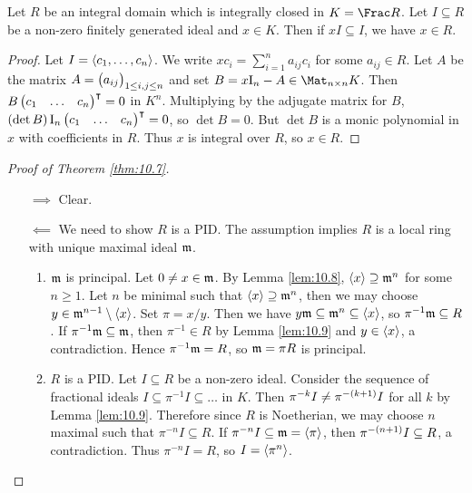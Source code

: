 \begin{lemma}
\label{lem:10.9}
Let $ R $ be an integral domain which is integrally closed in $ K = \Frac R $. Let $ I \subseteq R $ be a non-zero finitely generated ideal and $ x \in K $. Then if $ xI \subseteq I $, we have $ x \in R $.
\end{lemma}

\begin{proof}
Let $ I = \left\langle c_1, \dots, c_n \right\rangle $. We write $ xc_i = \sum_{i = 1}^n a_{ij}c_i $ for some $ a_{ij} \in R $. Let $ A $ be the matrix $ A = \br{a_{ij}}_{1 \le i, j \le n} $ and set $ B = x\I_n - A \in \Mat_{n \times n} K $. Then $ B\onebythree{c_1}{\dots}{c_n}^\intercal = 0 $ in $ K^n $. Multiplying by the adjugate matrix for $ B $, $ \br{\det B}\I_n\onebythree{c_1}{\dots}{c_n}^\intercal = 0 $, so $ \det B = 0 $. But $ \det B $ is a monic polynomial in $ x $ with coefficients in $ R $. Thus $ x $ is integral over $ R $, so $ x \in R $.
\end{proof}

\begin{proof}[Proof of Theorem \ref{thm:10.7}]
\hfill
\begin{itemize}
\item[$ \implies $] Clear.
\item[$ \impliedby $] We need to show $ R $ is a PID. The assumption implies $ R $ is a local ring with unique maximal ideal $ \mathfrak{m} $.
\begin{enumerate}[leftmargin=0.5in, label=Step \arabic*.]
\item $ \mathfrak{m} $ is principal. Let $ 0 \ne x \in \mathfrak{m} $. By Lemma \ref{lem:10.8}, $ \left\langle x \right\rangle \supseteq \mathfrak{m}^n $ for some $ n \ge 1 $. Let $ n $ be minimal such that $ \left\langle x \right\rangle \supseteq \mathfrak{m}^n $, then we may choose $ y \in \mathfrak{m}^{n - 1} \setminus \left\langle x \right\rangle $. Set $ \pi = x / y $. Then we have $ y\mathfrak{m} \subseteq \mathfrak{m}^n \subseteq \left\langle x \right\rangle $, so $ \pi^{-1}\mathfrak{m} \subseteq R $. If $ \pi^{-1}\mathfrak{m} \subseteq \mathfrak{m} $, then $ \pi^{-1} \in R $ by Lemma \ref{lem:10.9} and $ y \in \left\langle x \right\rangle $, a contradiction. Hence $ \pi^{-1}\mathfrak{m} = R $, so $ \mathfrak{m} = \pi R $ is principal.
\item $ R $ is a PID. Let $ I \subseteq R $ be a non-zero ideal. Consider the sequence of fractional ideals $ I \subseteq \pi^{-1}I \subseteq \dots $ in $ K $. Then $ \pi^{-k}I \ne \pi^{-\br{k + 1}}I $ for all $ k $ by Lemma \ref{lem:10.9}. Therefore since $ R $ is Noetherian, we may choose $ n $ maximal such that $ \pi^{-n}I \subseteq R $. If $ \pi^{-n}I \subseteq \mathfrak{m} = \left\langle \pi \right\rangle $, then $ \pi^{-\br{n + 1}}I \subseteq R $, a contradiction. Thus $ \pi^{-n}I = R $, so $ I = \left\langle \pi^n \right\rangle $.
\end{enumerate}
\end{itemize}
\end{proof}

